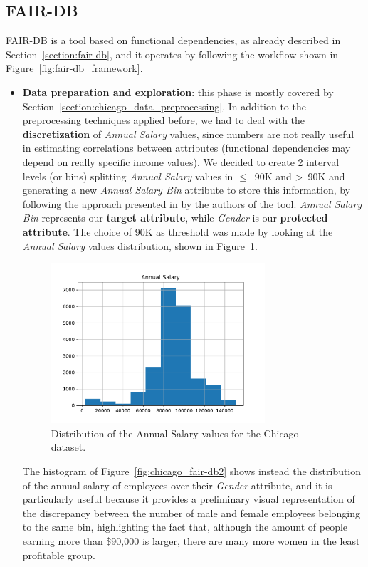 \subsection{FAIR-DB}
FAIR-DB is a tool based on functional dependencies, as already described in Section~\ref{section:fair-db}, and it operates by following the workflow shown in Figure~\ref{fig:fair-db_framework}.
\begin{itemize}
\item \textbf{Data preparation and exploration}: this phase is mostly covered by Section~\ref{section:chicago_data_preprocessing}. In addition to the preprocessing techniques applied before, we had to deal with the \textbf{discretization} of \textit{Annual Salary} values, since numbers are not really useful in estimating correlations between attributes (functional dependencies may depend on really specific income values). We decided to create 2 interval levels (or bins) splitting \textit{Annual Salary} values in \(\leq\)~90K and >~90K and generating a new \textit{Annual Salary Bin} attribute to store this information, by following the approach presented in \cite{azzalini2021fair} by the authors of the tool. \textit{Annual Salary Bin} represents our \textbf{target attribute}, while \textit{Gender} is our \textbf{protected attribute}. The choice of 90K as threshold was made by looking at the \textit{Annual Salary} values distribution, shown in Figure~\ref{fig:chicago_fair-db1}.

\begin{figure}[h!]
\centering
\includegraphics[width=0.75\textwidth]{figures/Chicago_annual_salary_distribution.pdf}
\caption{Distribution of the \textrm{Annual Salary} values for the Chicago dataset.}
\label{fig:chicago_fair-db1}
\end{figure}

The histogram of Figure~\ref{fig:chicago_fair-db2} shows instead the distribution of the annual salary of employees over their \textit{Gender} attribute, and it is particularly useful because it provides a preliminary visual representation of the discrepancy between the number of male and female employees belonging to the same bin, highlighting the fact that, although the amount of people earning more than \$90,000 is larger, there are many more women in the least profitable group.


\end{itemize}
